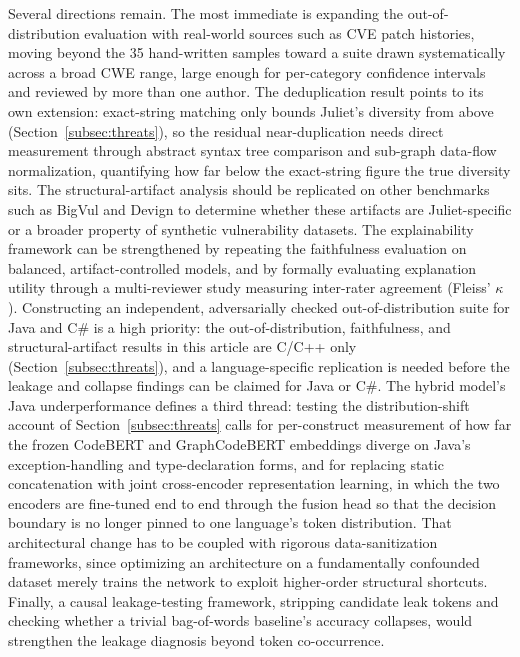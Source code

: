 \documentclass{ieeeaccess}
\begin{document}
Several directions remain. The most immediate is expanding the out-of-distribution evaluation with real-world sources such as CVE patch histories, moving beyond the 35 hand-written samples toward a suite drawn systematically across a broad CWE range, large enough for per-category confidence intervals and reviewed by more than one author. The deduplication result points to its own extension: exact-string matching only bounds Juliet's diversity from above (Section~\ref{subsec:threats}), so the residual near-duplication needs direct measurement through abstract syntax tree comparison and sub-graph data-flow normalization, quantifying how far below the exact-string figure the true diversity sits. The structural-artifact analysis should be replicated on other benchmarks such as BigVul and Devign to determine whether these artifacts are Juliet-specific or a broader property of synthetic vulnerability datasets. The explainability framework can be strengthened by repeating the faithfulness evaluation on balanced, artifact-controlled models, and by formally evaluating explanation utility through a multi-reviewer study measuring inter-rater agreement (Fleiss' $\kappa$). Constructing an independent, adversarially checked out-of-distribution suite for Java and C\# is a high priority: the out-of-distribution, faithfulness, and structural-artifact results in this article are C/C++ only (Section~\ref{subsec:threats}), and a language-specific replication is needed before the leakage and collapse findings can be claimed for Java or C\#. The hybrid model's Java underperformance defines a third thread: testing the distribution-shift account of Section~\ref{subsec:threats} calls for per-construct measurement of how far the frozen CodeBERT and GraphCodeBERT embeddings diverge on Java's exception-handling and type-declaration forms, and for replacing static concatenation with joint cross-encoder representation learning, in which the two encoders are fine-tuned end to end through the fusion head so that the decision boundary is no longer pinned to one language's token distribution. That architectural change has to be coupled with rigorous data-sanitization frameworks, since optimizing an architecture on a fundamentally confounded dataset merely trains the network to exploit higher-order structural shortcuts. Finally, a causal leakage-testing framework, stripping candidate leak tokens and checking whether a trivial bag-of-words baseline's accuracy collapses, would strengthen the leakage diagnosis beyond token co-occurrence.

\end{document}
